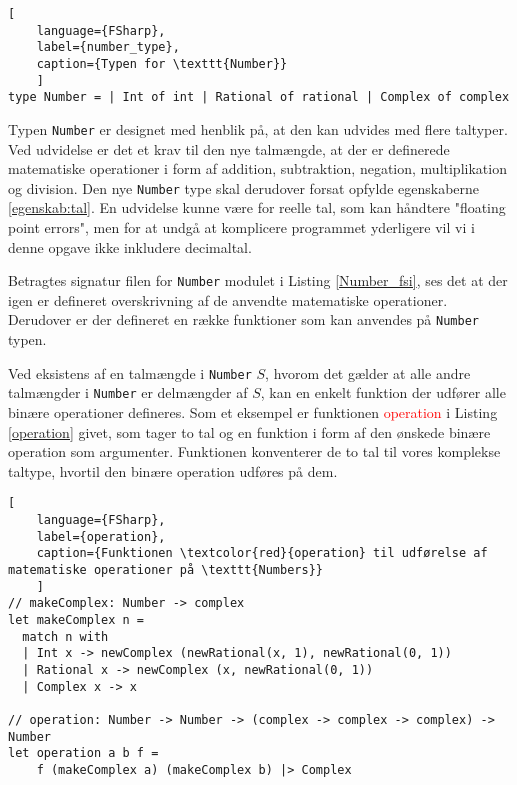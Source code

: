 \begin{lstlisting}[
    language={FSharp}, 
    label={number_type}, 
    caption={Typen for \texttt{Number}}
    ]
type Number = | Int of int | Rational of rational | Complex of complex
\end{lstlisting}

Typen \texttt{Number} er designet med henblik på, at den kan udvides med flere taltyper. Ved udvidelse er det et krav til den nye talmængde, at der er definerede matematiske operationer i form af addition, subtraktion, negation, multiplikation og division. Den nye \texttt{Number} type skal derudover forsat opfylde egenskaberne \ref{egenskab:tal}. En udvidelse kunne være for reelle tal, som kan håndtere "floating point errors", men for at undgå at komplicere programmet yderligere vil vi i denne opgave ikke inkludere decimaltal.


Betragtes signatur filen for \texttt{Number} modulet i Listing \ref{Number_fsi}, ses det at der igen er defineret overskrivning af de anvendte matematiske operationer. Derudover er der defineret en række funktioner som kan anvendes på \texttt{Number} typen. 



Ved eksistens af en talmængde i \texttt{Number} $S$, hvorom det gælder at alle andre talmængder i \texttt{Number} er delmængder af $S$, kan en enkelt funktion der udfører alle binære operationer defineres. Som et eksempel er funktionen \textcolor{red}{operation} i Listing \ref{operation} givet, som tager to tal og en funktion i form af den ønskede binære operation som argumenter. Funktionen konventerer de to tal til vores komplekse taltype, hvortil den binære operation udføres på dem. 

\begin{lstlisting}[
    language={FSharp},
    label={operation}, 
    caption={Funktionen \textcolor{red}{operation} til udførelse af matematiske operationer på \texttt{Numbers}}
    ]
// makeComplex: Number -> complex
let makeComplex n =
  match n with
  | Int x -> newComplex (newRational(x, 1), newRational(0, 1))
  | Rational x -> newComplex (x, newRational(0, 1))
  | Complex x -> x

// operation: Number -> Number -> (complex -> complex -> complex) -> Number
let operation a b f =
    f (makeComplex a) (makeComplex b) |> Complex

\end{lstlisting}

